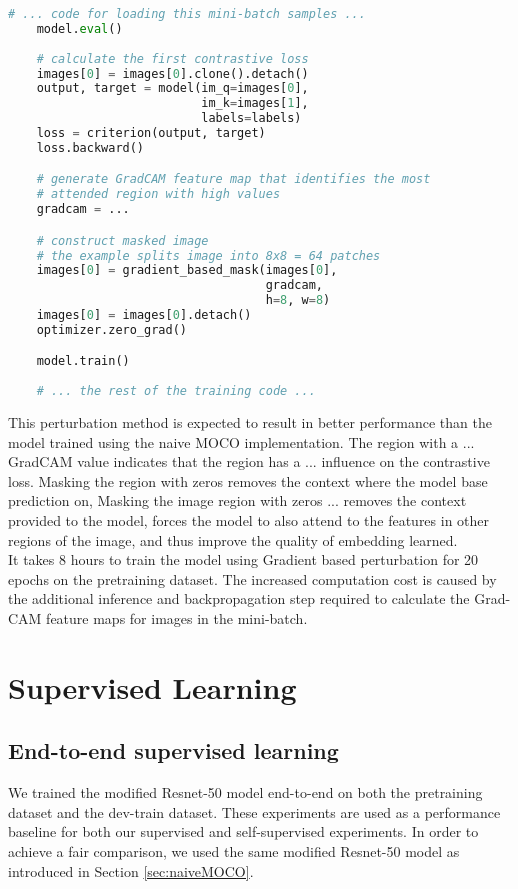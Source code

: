 \documentclass[12pt,twoside]{report}
\begin{document}
\begin{lstlisting}[language=Python, caption=additional training code for using ]
    # ... code for loading this mini-batch samples ...
    model.eval()
    
    # calculate the first contrastive loss
    images[0] = images[0].clone().detach()
    output, target = model(im_q=images[0], 
                           im_k=images[1], 
                           labels=labels)
    loss = criterion(output, target)
    loss.backward()

    # generate GradCAM feature map that identifies the most 
    # attended region with high values
    gradcam = ...

    # construct masked image
    # the example splits image into 8x8 = 64 patches
    images[0] = gradient_based_mask(images[0], 
                                    gradcam, 
                                    h=8, w=8)
    images[0] = images[0].detach()
    optimizer.zero_grad()

    model.train()
    
    # ... the rest of the training code ...
\end{lstlisting}

This perturbation method is expected to result in better performance than the model trained using the naive MOCO implementation. The region with a ... GradCAM value indicates that the region has a ... influence on the contrastive loss. Masking the region with zeros removes the context where the model base prediction on, Masking the image region with zeros ... removes the context provided to the model, forces the model to also attend to the features in other regions of the image, and thus improve the quality of embedding learned. \\

It takes 8 hours to train the model using Gradient based perturbation for 20 epochs on the pretraining dataset. The increased computation cost is caused by the additional inference and backpropagation step required to calculate the Grad-CAM feature maps for images in the mini-batch. 

\section{Supervised Learning}
\subsection{End-to-end supervised learning} \label{sec:naive_supervised}
We trained the modified Resnet-50 model end-to-end on both the pretraining dataset and the dev-train dataset. These experiments are used as a performance baseline for both our supervised and self-supervised experiments. In order to achieve a fair comparison, we used the same modified Resnet-50 model as introduced in Section \ref{sec:naiveMOCO}. \\
\end{document}
